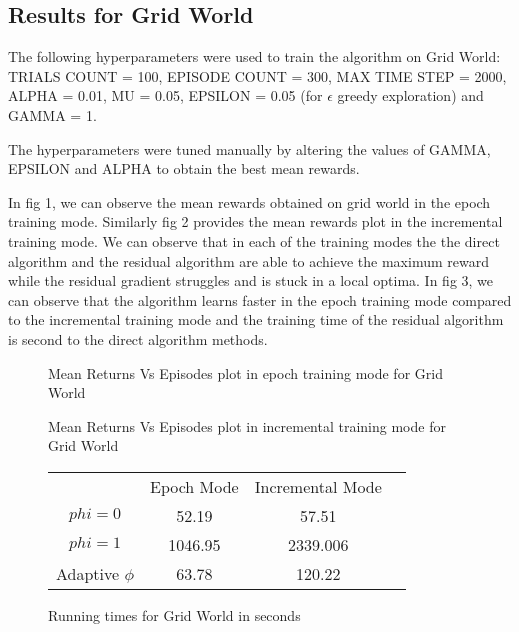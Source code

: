 \documentclass[fleqn]{article}
\begin{document}
\subsection*{Results for Grid World}

The following hyperparameters were used to train the algorithm on Grid World:
TRIALS COUNT = 100, EPISODE COUNT = 300, MAX TIME STEP = 2000, ALPHA = 0.01, MU = 0.05,
EPSILON = 0.05 (for $\epsilon$ greedy exploration) and GAMMA = 1.

The hyperparameters were tuned manually by altering the values of GAMMA, EPSILON and ALPHA to obtain the best mean rewards.

In fig 1, we can observe the mean rewards obtained on grid world in the epoch training mode. Similarly fig 2 provides the mean rewards plot in the incremental training mode. We can observe that in each of the training modes the the direct algorithm and the residual algorithm are able to achieve the maximum reward while the residual gradient struggles and is stuck in a local optima. In fig 3, we can observe that the algorithm learns faster in the epoch training mode compared to the incremental training mode and the training time of the residual algorithm is second to the direct algorithm methods. 


\begin{figure}%
    \centering
    \qquad
    \qquad
    \caption{Mean Returns Vs Episodes plot in epoch training mode for Grid World}%
    \label{fig:example}%
\end{figure}

\begin{figure}%
    \centering
    \qquad
    \qquad
    \caption{Mean Returns Vs Episodes plot in incremental training mode for Grid World}%
    \label{fig:example}%
\end{figure}



\begin{figure}%
\begin{center}
\begin{tabular}{ |c|c|c|c| } 
 \hline
           & Epoch Mode & Incremental Mode \\
 $phi = 0$ & 52.19 & 57.51 \\ 
 $phi = 1$ & 1046.95 & 2339.006 \\ 
 Adaptive $\phi$ & 63.78 & 120.22 \\ 
 \hline
\end{tabular}
\end{center}
\caption{Running times for Grid World in seconds}%
    \label{fig:example}%
\end{figure}
\end{document}
